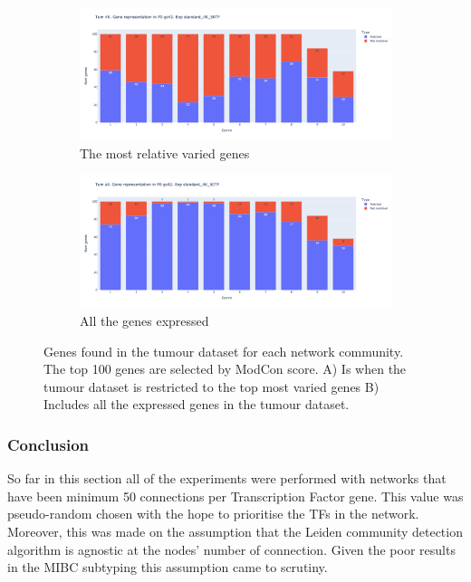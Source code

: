 \begin{figure}[!htb]
    \hfill
    \begin{subfigure}[b]{0.47\textwidth}
        \centering
        \includegraphics[width=\textwidth,keepaspectratio]{Sections/Network_I/Resources/P0/4K_p0_modConMev_rep_standard_4K_50TF.png}
        \caption{The most relative varied genes}
    \end{subfigure}
    \hfill
    \begin{subfigure}[b]{0.47\textwidth}
        \centering
        \includegraphics[width=\textwidth,keepaspectratio]{Sections/Network_I/Resources/P0/10K_p0_modConMev_rep_standard_4K_50TF.png}
        \caption{All the genes expressed}
    \end{subfigure}
    \hfill
    \caption{Genes found in the tumour dataset for each network community. The top 100 genes are selected by ModCon score. A) Is when the tumour dataset is restricted to the top most varied genes B) Includes all the expressed genes in the tumour dataset. }
    \label{fig:N_I:p0_mev_rep}
\end{figure}


\subsubsection{Conclusion}

So far in this section all of the experiments were performed with networks that have been minimum 50 connections per Transcription Factor gene. This value was pseudo-random chosen with the hope to prioritise the TFs in the network. Moreover, this was made on the assumption that the Leiden community detection algorithm is agnostic at the nodes' number of connection. Given the poor results in the MIBC subtyping this assumption came to scrutiny. 


